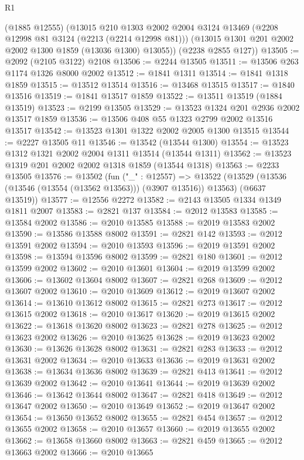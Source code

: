 \begin{lexlean}{R1}
\begin{coremodule}
      (@1885 @12555)
      (@13015
        @210
        @1303
        @2002
        @2004
        @3124
        @13469
        (@2208 @12998 @81 @3124 (@2213 (@2214 @12998 @81)))
        (@13015 @1301 @201 @2002 @2002 @1300 @1859 (@13036 @1300) @13055))
      (@2238 @2855 @127))
@13505 := @2092 (@2105 @3122) @2108
@13506 := @2244 @13505
@13511 := @13506 @263 @1174 @1326 @8000 @2002
@13512 := @1841 @1311
@13514 := @1841 @1318 @1859
@13515 := @13512 @13514
@13516 := @13468 @13515
@13517 := @1840 @13516
@13519 := @1841 @13517 @1859
@13522 := @13511 @13519 (@1884 @13519)
@13523 := @2199 @13505
@13529 := @13523 @1324 @201 @2936 @2002 @13517 @1859
@13536 := @13506 @408 @55 @1323 @2799 @2002 @13516 @13517
@13542 := @13523 @1301 @1322 @2002 @2005 @1300 @13515
@13544 := @2227 @13505 @11
@13546 := @13542 (@13544 @1300)
@13554 := @13523 @1312 @1321 @2002 @2004 @1311 @13514 (@13544 @1311)
@13562 := @13523 @1319 @201 @2002 @2002 @1318 @1859 (@13544 @1318)
@13563 := @2233 @13505
@13576 := @13502
    (fun ("_" : @12557) =>
    @13522 (@13529 (@13536 (@13546 (@13554 (@13562 @13563))) (@3907 @13516)) @13563) (@6637 @13519))
@13577 := @12556 @2272
@13582 := @2143 @13505 @1334 @1349 @1811 @2007
@13583 := @2821 @137
@13584 := @2012 @13583
@13585 := @13584 @2002
@13586 := @2010 @13585
@13588 := @2019 @13583 @2002
@13590 := @13586 @13588 @8002
@13591 := @2821 @142
@13593 := @2012 @13591 @2002
@13594 := @2010 @13593
@13596 := @2019 @13591 @2002
@13598 := @13594 @13596 @8002
@13599 := @2821 @180
@13601 := @2012 @13599 @2002
@13602 := @2010 @13601
@13604 := @2019 @13599 @2002
@13606 := @13602 @13604 @8002
@13607 := @2821 @268
@13609 := @2012 @13607 @2002
@13610 := @2010 @13609
@13612 := @2019 @13607 @2002
@13614 := @13610 @13612 @8002
@13615 := @2821 @273
@13617 := @2012 @13615 @2002
@13618 := @2010 @13617
@13620 := @2019 @13615 @2002
@13622 := @13618 @13620 @8002
@13623 := @2821 @278
@13625 := @2012 @13623 @2002
@13626 := @2010 @13625
@13628 := @2019 @13623 @2002
@13630 := @13626 @13628 @8002
@13631 := @2821 @283
@13633 := @2012 @13631 @2002
@13634 := @2010 @13633
@13636 := @2019 @13631 @2002
@13638 := @13634 @13636 @8002
@13639 := @2821 @413
@13641 := @2012 @13639 @2002
@13642 := @2010 @13641
@13644 := @2019 @13639 @2002
@13646 := @13642 @13644 @8002
@13647 := @2821 @418
@13649 := @2012 @13647 @2002
@13650 := @2010 @13649
@13652 := @2019 @13647 @2002
@13654 := @13650 @13652 @8002
@13655 := @2821 @454
@13657 := @2012 @13655 @2002
@13658 := @2010 @13657
@13660 := @2019 @13655 @2002
@13662 := @13658 @13660 @8002
@13663 := @2821 @459
@13665 := @2012 @13663 @2002
@13666 := @2010 @13665

\end{coremodule}
\end{lexlean}
